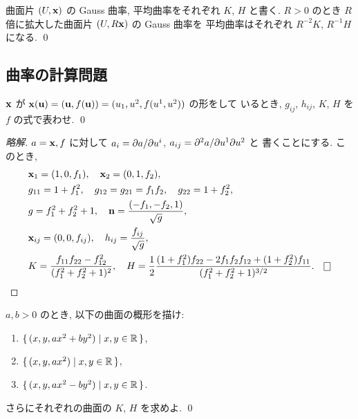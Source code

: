 \documentclass[12pt,twoside]{jarticle}
\newcommand\commentout[1]{#1}
\newcommand\commentout[1]{}
\begin{document}
\begin{question}[スケール変換]
  曲面片 $(U,{\mathbf x})$ の Gauss 曲率, 平均曲率をそれぞれ $K$, $H$ と書く.
  $R>0$ のとき $R$ 倍に拡大した曲面片 $(U,R{\mathbf x})$ の Gauss 曲率を
  平均曲率はそれぞれ $R^{-2}K$, $R^{-1}H$ になる.
  \qed
\end{question}


\subsection{曲率の計算問題}
\label{sec:clac-K,H}

\begin{question}
 ${\mathbf x}$ が ${\mathbf x}({\mathbf u}) = ({\mathbf u}, f({\mathbf u})) = (u_1, u^2, f(u^1, u^2))$ の形をして
 いるとき, $g_{ij}$, $h_{ij}$, $K$, $H$ を $f$ の式で表わせ. \qed
\end{question}

\commentout{
\begin{proof}[略解]
 $a={\mathbf x},f$ に対して $a_i=\partial a/\partial u^i$, $a_{ij}=\partial^2a/\partial u^1\partial u^2$ と
 書くことにする. このとき,
 \begin{align*}
  &
  \x_1 = (1,0,f_1), \quad
  \x_2 = (0,1,f_2), \quad
  \\ &
  g_{11} = 1+f_1^2, \quad
  g_{12} = g_{21} = f_1f_2, \quad
  g_{22} = 1+f_2^2, \quad
  \\ &
  g = f_1^2+f_2^2+1, \quad
  \n = \frac{(-f_1,-f_2,1)}{\sqrt{g}},
  \\ &
  \x_{ij} = (0,0,f_{ij}), \quad
  h_{ij} = \frac{f_{ij}}{\sqrt{g}},
  \\ &
  K = \frac{f_{11}f_{22}-f_{12}^2}{(f_1^2+f_2^2+1)^2}, \quad
  H = \frac{1}{2}
      \frac
      {(1+f_1^2)f_{22}-2f_1f_2f_{12}+(1+f_2^2)f_{11}}
      {(f_1^2+f_2^2+1)^{3/2}}.
  \qed
 \end{align*}
\end{proof}
}

\begin{question}
  $a,b>0$ のとき, 以下の曲面の概形を描け:
  \begin{enumerate}
  \item $\{\,(x,y, a x^2 + b y^2) \mid x,y \in {\mathbb R} \,\}$,
  \item $\{\,(x,y, a x^2  )       \mid x,y \in {\mathbb R} \,\}$,
  \item $\{\,(x,y, a x^2 - b y^2) \mid x,y \in {\mathbb R} \,\}$.
  \end{enumerate}
  さらにそれぞれの曲面の $K$, $H$ を求めよ.
  \qed
\end{question}
\end{document}
